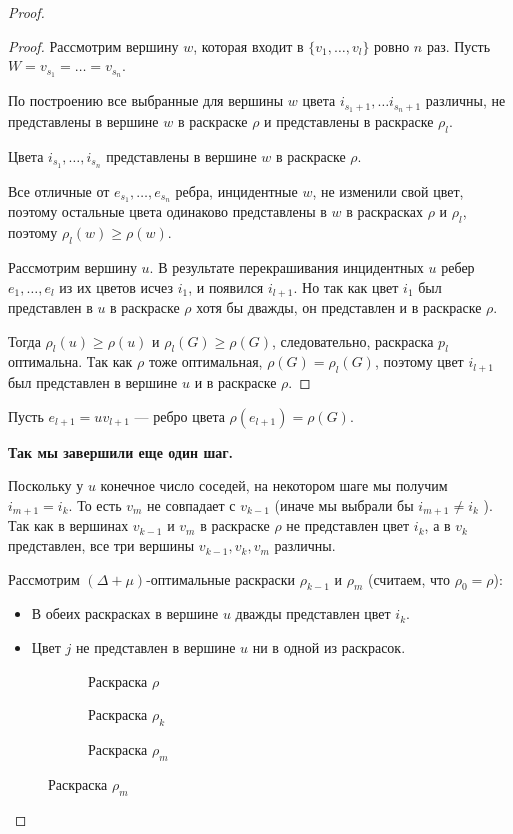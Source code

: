 \begin{proof}
\begin{proof}
		Рассмотрим вершину $w$, которая входит в  $\{v_1, \ldots , v_l\}$ ровно $n$ раз. Пусть $W = v_{s_1} = \ldots = v_{s_n}$.

		По построению все выбранные для вершины $w$ цвета $i_{s_1 + 1}, \ldots i_{s_n+1}$ различны, не представлены в вершине $w$ в раскраске $\rho$ и представлены в раскраске $\rho_l$.

		Цвета $i_{s_1}, \ldots , i_{s_n}$ представлены в вершине $w$ в раскраске $\rho$.

		Все отличные от $e_{s_1}, \ldots , e_{s_n}$ ребра, инцидентные $w$, не изменили свой цвет, поэтому остальные цвета одинаково представлены в $w$ в раскрасках $\rho$ и $\rho_l$, поэтому $\rho_l(w) \ge \rho(w)$.

		Рассмотрим вершину $u$. В результате перекрашивания инцидентных $u$ ребер $e_1, \ldots , e_l$ из их цветов исчез $i_1$, и появился $i_{l+1}$. Но так как цвет $i_1$ был представлен в $u$ в раскраске $\rho$ хотя бы дважды, он представлен и в раскраске $\rho$. 

		Тогда $\rho_l(u) \ge  \rho(u) $ и $\rho_l(G) \ge \rho(G)$, следовательно, раскраска $p_l$ оптимальна. Так как $\rho$ тоже  оптимальная, $\rho(G) = \rho_l(G)$, поэтому цвет $i_{l+1}$ был представлен в вершине $u$ и в раскраске $\rho$.
	\end{proof}
	Пусть $e_{l+1} = uv_{l+1}$ --- ребро цвета $\rho(e_{l+1}) = \rho(G)$. 

	{ \bf Так мы завершили еще один шаг. }

	Поскольку у $u$ конечное число соседей, на некотором шаге мы получим $i_{m+1} = i_k$. То есть $v_m$ не совпадает с $v_{k-1}$ (иначе мы выбрали бы $i_{m+1} \neq i_k$ ). Так как в вершинах $v_{k-1}$ и $v_m$ в раскраске $\rho$ не представлен цвет $i_{k}$, а в $v_k$ представлен, все три вершины $v_{k-1}, v_k, v_m$ различны.

	Рассмотрим $(\Delta+\mu)$-оптимальные раскраски $\rho_{k-1}$ и $\rho_m$ (считаем, что $\rho_0 = \rho$):
\begin{itemize}
	\item В обеих раскрасках в вершине $u$ дважды представлен цвет  $i_k$.
	\item Цвет $j$ не представлен в вершине $u$ ни в одной из раскрасок.
\end{itemize}
\begin{figure}[ht]
    \centering
	\begin{subfigure}{0.3\textwidth}
		\centering
		\caption{Раскраска $\rho$}
		\label{fig:vising-theorem}
	\end{subfigure}
	\hfill
	\begin{subfigure}{0.34\textwidth}
		\centering
		\caption{Раскраска $\rho_k$}
		\label{fig:vising-theorem-2}
	\end{subfigure}
	\hfill
	\begin{subfigure}{0.34\textwidth}
		\centering
		\caption{Раскраска $\rho_m$}
		\label{fig:vising-theorem-3}
	\end{subfigure}
\end{figure}


\end{proof}
